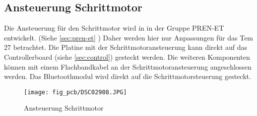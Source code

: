 \subsection{Ansteuerung Schrittmotor}
\label{sec:stepperdriver}
Die Ansteuerung für den Schrittmotor wird in in der Gruppe PREN-ET entwickelt. 
(Siehe \ref{sec:pren-et} ) 
Daher werden hier nur Anpassungen für das Tem 27 betrachtet. 
Die Platine mit der Schrittmotoransteuerung kann direkt auf das 
Controllerboard (siehe \ref{sec:control}) gesteckt werden.  Die weiteren 
Komponenten können mit einem Flachbandkabel an der Schrittmotoransteuerung 
angeschlossen werden. Das Bluetoothmodul wird direkt auf die 
Schrittmotorsteuerung gesteckt. 
\begin{figure}[h!]
    \centering
    \texttt{[image: fig\_pcb/DSC02908.JPG]}
    \caption{Ansteuerung Schrittmotor}
    \label{fig:dc}
\end{figure}

